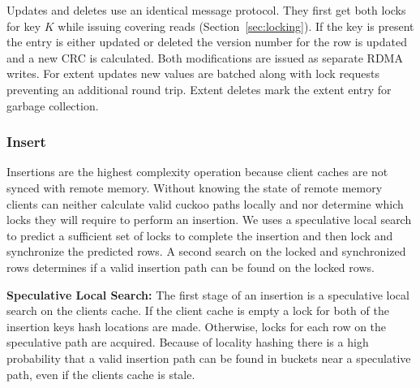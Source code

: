 Updates and deletes use an identical message protocol. They
first get both locks for key $K$ while issuing covering
reads (Section~\ref{sec:locking}). If the key is present the
entry is either updated or deleted the version number for
the row is updated and a new CRC is calculated. Both
modifications are issued as separate RDMA writes. For extent
updates new values are batched along with lock requests
preventing an additional round trip. Extent deletes mark the
extent entry for garbage collection.


\subsubsection{Insert}
\label{sec:insert}

Insertions are the highest complexity operation because
client caches are not synced with remote memory. Without
knowing the state of remote memory clients can neither
calculate valid cuckoo paths locally and nor determine which
locks they will require to perform an insertion. We uses a
speculative local search to predict a sufficient set of
locks to complete the insertion and then lock and
synchronize the predicted rows. A second search on the
locked and synchronized rows determines if a valid insertion
path can be found on the locked rows.

\textbf{Speculative Local Search:} The first stage of an
insertion is a speculative local search on the clients
cache. If the client cache is empty a lock for both of the
insertion keys hash locations are made. Otherwise, locks for
each row on the speculative path are acquired. Because of
locality hashing there is a high probability that a valid
insertion path can be found in buckets near a speculative
path, even if the clients cache is stale.

